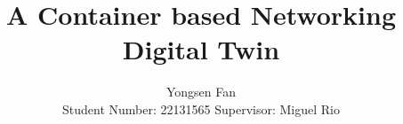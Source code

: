 \documentclass[10pt]{article} %
\title{A Container based Networking Digital Twin}
\author{
\name Yongsen Fan\\
\addr Student Number: 22131565 \hfill Supervisor: Miguel Rio
}
\begin{document}
\maketitle









\label{body:end}




\appendix

\end{document}
